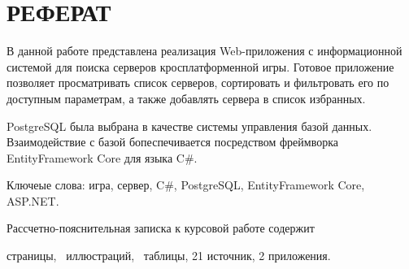 \chapter*{РЕФЕРАТ}

В данной работе представлена реализация Web-приложения с информационной системой для поиска серверов кросплатформенной игры. Готовое приложение позволяет просматривать список серверов, сортировать и фильтровать его по доступным параметрам, а также добавлять сервера в список избранных.

PostgreSQL была выбрана в качестве системы управления базой данных. Взаимодействие с базой бопеспечивается посредством фреймворка EntityFramework Core для языка C\#.

Ключеые слова: игра, сервер, C\#, PostgreSQL, EntityFramework Core, ASP.NET.

Рассчетно-пояснительная записка к курсовой работе содержит \begin{NoHyper}\pageref{LastPage}\end{NoHyper} страницы, \totfig~иллюстраций, \tottab~таблицы, 21 источник, 2 приложения. %

